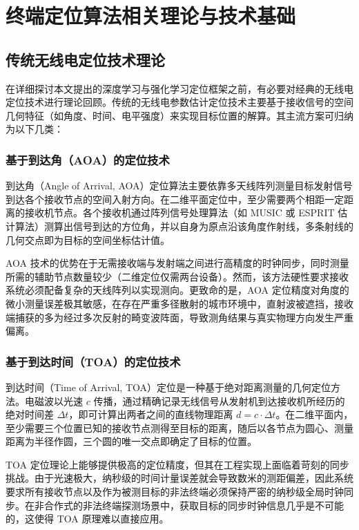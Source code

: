 \chapter{终端定位算法相关理论与技术基础}

\section{传统无线电定位技术理论}

在详细探讨本文提出的深度学习与强化学习定位框架之前，有必要对经典的无线电定位技术进行理论回顾。传统的无线电参数估计定位技术主要基于接收信号的空间几何特征（如角度、时间、电平强度）来实现目标位置的解算。其主流方案可归纳为以下几类：

\subsection{基于到达角（AOA）的定位技术}

到达角（Angle of Arrival, AOA）定位算法主要依靠多天线阵列测量目标发射信号到达各个接收节点的空间入射方向。在二维平面定位中，至少需要两个相距一定距离的接收机节点。各个接收机通过阵列信号处理算法（如 MUSIC 或 ESPRIT 估计算法）测算出信号到达的方位角，并以自身为原点沿该角度作射线，多条射线的几何交点即为目标的空间坐标估计值。

AOA 技术的优势在于无需接收端与发射端之间进行高精度的时钟同步，同时测量所需的辅助节点数量较少（二维定位仅需两台设备）。然而，该方法硬性要求接收系统必须配备复杂的天线阵列以实现测向。更致命的是，AOA 定位精度对角度的微小测量误差极其敏感，在存在严重多径散射的城市环境中，直射波被遮挡，接收端捕获的多为经过多次反射的畸变波阵面，导致测角结果与真实物理方向发生严重偏离。

\subsection{基于到达时间（TOA）的定位技术}

到达时间（Time of Arrival, TOA）定位是一种基于绝对距离测量的几何定位方法。电磁波以光速 $c$ 传播，通过精确记录无线信号从发射机到达接收机所经历的绝对时间差 $\Delta t$，即可计算出两者之间的直线物理距离 $d = c \cdot \Delta t$。在二维平面内，至少需要三个位置已知的接收节点测得至目标的距离，随后以各节点为圆心、测量距离为半径作圆，三个圆的唯一交点即确定了目标的位置。

TOA 定位理论上能够提供极高的定位精度，但其在工程实现上面临着苛刻的同步挑战。由于光速极大，纳秒级的时间计量误差就会导致数米的测距偏差，因此系统要求所有接收节点以及作为被测目标的非法终端必须保持严密的纳秒级全局时钟同步。在非合作式的非法终端探测场景中，获取目标的同步时钟信息几乎是不可能的，这使得 TOA 原理难以直接应用。

